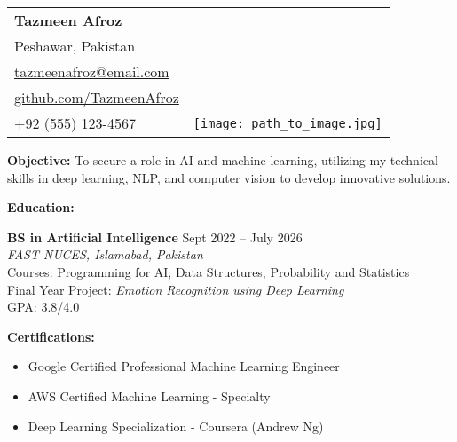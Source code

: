 \documentclass[a4paper,12pt]{article}
\begin{document}
\vspace*{-5em}

\noindent
\begin{tabular}{@{}p{}@{}p{}@{}}
    \raggedright
    \textbf{Tazmeen Afroz} \\ %
    Peshawar, Pakistan \\
    \href{mailto:tazmeenafroz@email.com}{tazmeenafroz@email.com} \\
    \href{https://github.com/TazmeenAfroz}{github.com/TazmeenAfroz} \\
    +92 (555) 123-4567
    &
    \raggedleft
    \texttt{[image: path\_to\_image.jpg]} %
\end{tabular}

\vspace{1em}
\noindent
\textbf{Objective:} To secure a role in AI and machine learning, utilizing my technical skills in deep learning, NLP, and computer vision to develop innovative solutions.

\vspace{1em}
\noindent
\textbf{Education:}

\textbf{BS in Artificial Intelligence} \hfill Sept 2022 -- July 2026 \\
\textit{FAST NUCES, Islamabad, Pakistan} \\
Courses: Programming for AI, Data Structures, Probability and Statistics \\
Final Year Project: \textit{Emotion Recognition using Deep Learning} \\
GPA: 3.8/4.0

\vspace{1em}
\noindent
\textbf{Certifications:}
\begin{itemize}[leftmargin=*]
    \item Google Certified Professional Machine Learning Engineer
    \item AWS Certified Machine Learning - Specialty
    \item Deep Learning Specialization - Coursera (Andrew Ng)
\end{itemize}
\end{document}
